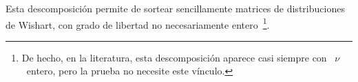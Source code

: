 Esta   descomposici\'on   permite   de   sortear   sencillamente   matrices   de
distribuciones   de   Wishart,  con   grado   de   libertad  no   necesariamente
entero~\footnote{De hecho, en la  literatura, esta descomposici\'on aparece casi
  siempre con \ $\nu$ \ entero, pero la prueba no necesite este v\'inculo.}.
